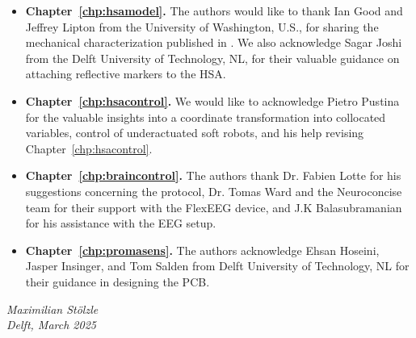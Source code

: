 \begin{itemize}
    \item \textbf{Chapter~\ref{chp:hsamodel}.} The authors would like to thank Ian Good and Jeffrey Lipton from the University of Washington, U.S., for sharing the mechanical characterization published in \cite{good2022expanding}. We also acknowledge Sagar Joshi from the Delft University of Technology, NL, for their valuable guidance on attaching reflective markers to the HSA.
    \item \textbf{Chapter~\ref{chp:hsacontrol}.} We would like to acknowledge Pietro Pustina for the valuable insights into a coordinate transformation into collocated variables, control of underactuated soft robots, and his help revising Chapter~\ref{chp:hsacontrol}.
    \item \textbf{Chapter~\ref{chp:braincontrol}.} The authors thank Dr. Fabien Lotte for his suggestions concerning the protocol, Dr. Tomas Ward and the Neuroconcise team for their support with the FlexEEG device, and J.K Balasubramanian for his assistance with the EEG setup.
    \item \textbf{Chapter~\ref{chp:promasens}.} The authors acknowledge Ehsan Hoseini, Jasper Insinger, and Tom Salden from Delft University of Technology, NL for their guidance in designing the \gls{PCB}.
\end{itemize}

\begin{flushright}
{\makeatletter\itshape
    Maximilian Stölzle \\
    Delft, March 2025
\makeatother}
\end{flushright}


